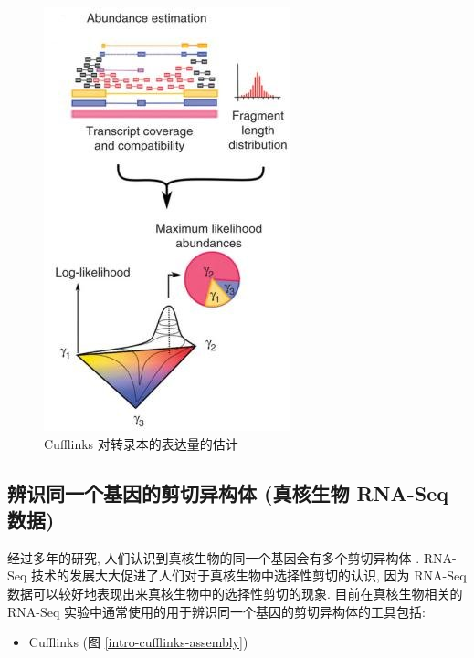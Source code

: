 \begin{figure}[!t]
\centering
\includegraphics[height=0.5\textheight]{figures/cufflinks-abundance.jpg}
\caption{Cufflinks 对转录本的表达量的估计 \cite{cufflinks.2010}}
\label{intro-cufflinks-abundance}
\end{figure}

\subsection{辨识同一个基因的剪切异构体 (真核生物 RNA-Seq 数据)}
经过多年的研究, 人们认识到真核生物的同一个基因会有多个剪切异构体 
\cite{gilbert1978genes, rosenfeld1982calcitonin, early1980two, 
citeulike:447573, modrek2002genomic}. 
RNA-Seq 技术的发展大大促进了人们对于真核生物中选择性剪切的认识, 
因为 RNA-Seq 数据可以较好地表现出来真核生物中的选择性剪切的现象. 
目前在真核生物相关的 RNA-Seq 实验中通常使用的用于辨识同一个基因的剪切异构体的工具包括: 
\begin{itemize}
\item Cufflinks \cite{cufflinks.2010} (图 \ref{intro-cufflinks-assembly})
\end{itemize}

